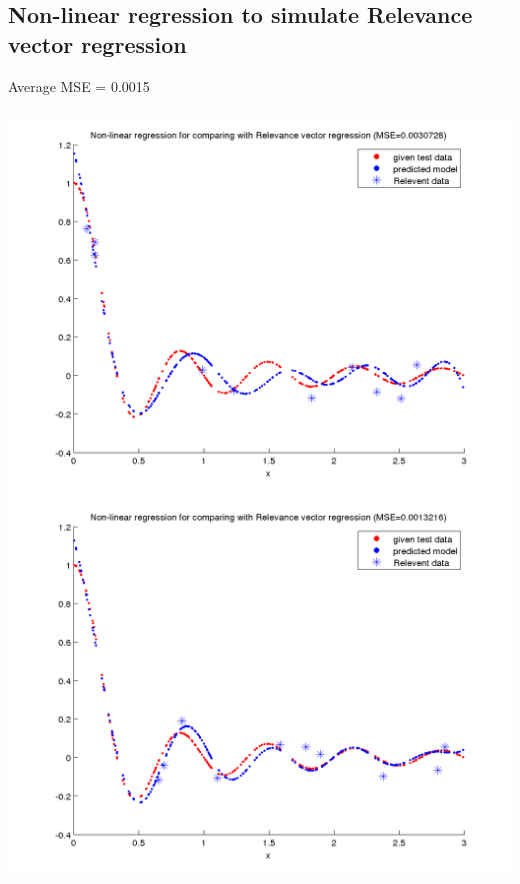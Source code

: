 \documentclass[fleqn]{article}
\begin{document}
\subsection{Non-linear regression to simulate Relevance vector regression}

Average MSE = 0.0015\\\\
\includegraphics[scale=0.4]{./pics/task5/non-linear-regression- rvr-random-1.png}
\includegraphics[scale=0.4]{./pics/task5/non-linear-regression- rvr-random-2.png}
\end{document}
